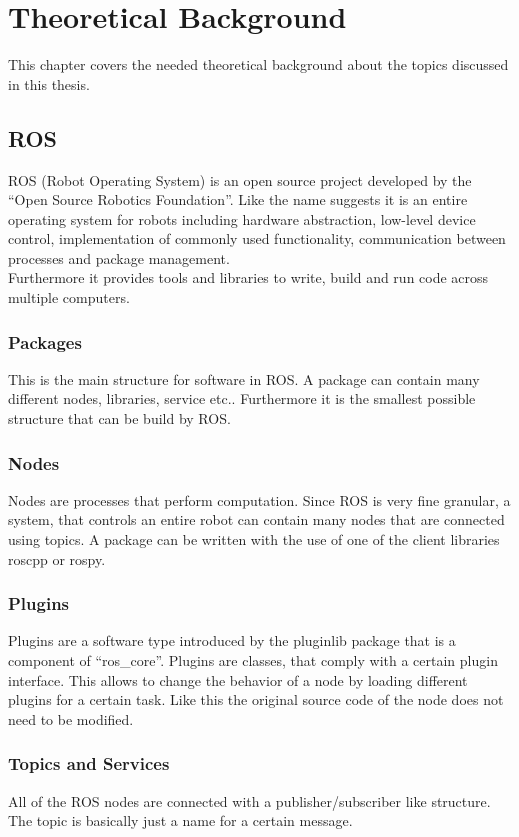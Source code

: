 \chapter{Theoretical Background}
\label{theoretical_background}
This chapter covers the needed theoretical background about the topics discussed in this thesis.

\section{ROS}
ROS (Robot Operating System) is an open source project developed by the ``Open Source Robotics Foundation''. Like the name suggests it is an entire operating system for robots including hardware abstraction, low-level device control, implementation of commonly used functionality, communication between processes and package management.\\
Furthermore it provides tools and libraries to write, build and run code across multiple computers\cite{rosintro}.\\

\subsection{Packages}
This is the main structure for software in ROS. A package can contain many different nodes, libraries, service etc.. Furthermore it is the smallest possible structure that can be build by ROS\cite{rosconcepts}.
\subsection{Nodes}
Nodes are processes that perform computation. Since ROS is very fine granular, a system, that controls an entire robot can contain many nodes that are connected using topics. A package can be written with the use of one of the client libraries roscpp or rospy\cite{rosconcepts}.
\subsection{Plugins}

Plugins are a software type introduced by the pluginlib package that is a component of ``ros\_core''. Plugins are classes, that comply with a certain plugin interface. This allows to change the behavior of a node by loading different plugins for a certain task. Like this the original source code of the node does not need to be modified\cite{pluginlib}.

\subsection{Topics and Services}
All of the ROS nodes are connected with a publisher/subscriber like structure. The topic is basically just a name for a certain message.\\

